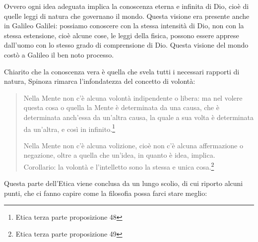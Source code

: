 Ovvero ogni idea adeguata implica la conoscenza eterna e infinita di Dio, cioè di quelle leggi di natura che governano il mondo. Questa visione era presente anche in Galileo Galilei: possiamo conoscere con la stessa intensità di Dio, non con la stessa estensione, cioè alcune cose, le leggi della fisica, possono essere apprese dall'uomo con lo stesso grado di comprensione di Dio. Questa visione del mondo costò a Galileo il ben noto processo.

Chiarito che la conoscenza vera è quella che svela tutti i necessari rapporti di natura, Spinoza rimarca l'infondatezza del concetto di volontà:

\begin{quotation}
	\small Nella Mente non c’è alcuna volontà indipendente o libera: ma nel volere questa cosa o
	quella la Mente è determinata da una causa, che è determinata anch’essa da un’altra causa,
	la quale a sua volta è determinata da un’altra, e così in infinito.\footnote{Etica terza parte proposizione 48}
	
	\small Nella Mente non c’è alcuna volizione, cioè non c’è alcuna affermazione o negazione, oltre
	a quella che un’idea, in quanto è idea, implica.\\Corollario: la volontà e l’intelletto sono la stessa e unica cosa.\footnote{Etica terza parte proposizione 49}
\end{quotation}

Questa parte dell'Etica viene conclusa da un lungo scolio, di cui riporto alcuni punti, che ci fanno capire come la filosofia possa farci stare meglio:

